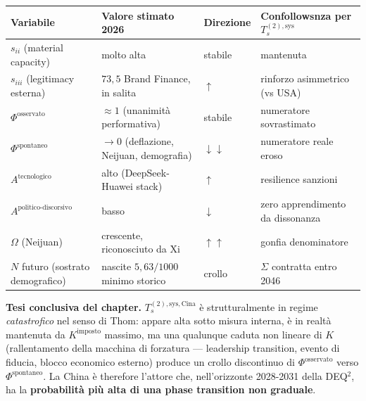 {\def\LTcaptype{none} %
{\small\begin{longtable}[]{@{}
  >{\raggedright\arraybackslash}p{}
  >{\raggedright\arraybackslash}p{}
  >{\raggedright\arraybackslash}p{}
  >{\raggedright\arraybackslash}p{}@{}}
\toprule\noalign{}
\begin{minipage}[b]{\linewidth}\raggedright
Variabile
\end{minipage} & \begin{minipage}[b]{\linewidth}\raggedright
Valore stimato 2026
\end{minipage} & \begin{minipage}[b]{\linewidth}\raggedright
Direzione
\end{minipage} & \begin{minipage}[b]{\linewidth}\raggedright
Confollowsnza per \(T_s^{(2),\text{sys}}\)
\end{minipage} \\
\midrule\noalign{}
\endhead
\bottomrule\noalign{}
\endlastfoot
\(s_{ii}\) (material capacity) & molto alta & stabile & mantenuta \\
\(s_{iii}\) (legitimacy esterna) & \(73{,}5\) Brand Finance, in salita
& \(\uparrow\) & rinforzo asimmetrico (vs USA) \\
\(\Phi^{\text{osservato}}\) & \(\approx 1\) (unanimità performativa) &
stabile & numeratore sovrastimato \\
\(\Phi^{\text{spontaneo}}\) & \(\to 0\) (deflazione, Neijuan,
demografia) & \(\downarrow\downarrow\) & numeratore reale eroso \\
\(A^{\text{tecnologico}}\) & alto (DeepSeek-Huawei stack) & \(\uparrow\)
& resilience sanzioni \\
\(A^{\text{politico-discorsivo}}\) & basso & \(\downarrow\) & zero
apprendimento da dissonanza \\
\(\Omega\) (Neijuan) & crescente, riconosciuto da Xi &
\(\uparrow\uparrow\) & gonfia denominatore \\
\(N\) futuro (sostrato demografico) & nascite \(5{,}63/1000\) minimo
storico & crollo & \(\Sigma\) contratta entro 2046 \\
\end{longtable}}
}

\Hypoth{} \textbf{Tesi conclusiva del chapter.}
\(T_s^{(2),\text{sys},\text{Cina}}\) è strutturalmente in regime
\emph{catastrofico} nel senso di Thom: appare alta sotto misura interna,
è in realtà mantenuta da \(K^{\text{imposto}}\) massimo, ma una
qualunque caduta non lineare di \(K\) (rallentamento della macchina di
forzatura --- leadership transition, evento di fiducia, blocco economico
esterno) produce un crollo discontinuo di \(\Phi^{\text{osservato}}\)
verso \(\Phi^{\text{spontaneo}}\). La China è therefore l'attore che,
nell'orizzonte 2028-2031 della DEQ$^2$, ha la \textbf{probabilità più alta
di una phase transition non graduale}.

